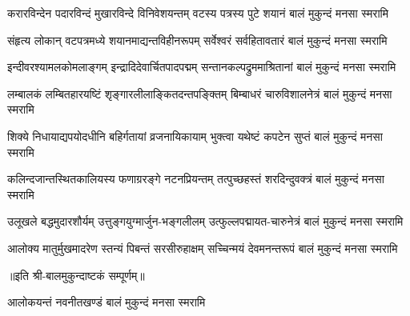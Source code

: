 

\twolineshloka
{करारविन्देन पदारविन्दं मुखारविन्दे विनिवेशयन्तम्}
{वटस्य पत्रस्य पुटे शयानं बालं मुकुन्दं मनसा स्मरामि}%

\twolineshloka
{संहृत्य लोकान् वटपत्रमध्ये शयानमाद्यन्तविहीनरूपम्}
{सर्वेश्वरं सर्वहितावतारं बालं मुकुन्दं मनसा स्मरामि}%

\twolineshloka
{इन्दीवरश्यामलकोमलाङ्गम् इन्द्रादिदेवार्चितपादपद्मम्}
{सन्तानकल्पद्रुममाश्रितानां बालं मुकुन्दं मनसा स्मरामि}%

\twolineshloka
{लम्बालकं लम्बितहारयष्टिं शृङ्गारलीलाङ्कितदन्तपङ्क्तिम्}
{बिम्बाधरं चारुविशालनेत्रं बालं मुकुन्दं मनसा स्मरामि}%

\twolineshloka
{शिक्ये निधायाद्यपयोदधीनि बहिर्गतायां व्रजनायिकायाम्}
{भुक्त्वा यथेष्टं कपटेन सुप्तं बालं मुकुन्दं मनसा स्मरामि}%

\twolineshloka
{कलिन्दजान्तस्थितकालियस्य फणाग्ररङ्गे नटनप्रियन्तम्}
{तत्पुच्छहस्तं शरदिन्दुवक्त्रं बालं मुकुन्दं मनसा स्मरामि}%

\twolineshloka
{उलूखले बद्धमुदारशौर्यम् उत्तुङ्गयुग्मार्जुन-भङ्गलीलम्}
{उत्फुल्लपद्मायत-चारुनेत्रं बालं मुकुन्दं मनसा स्मरामि}%

\twolineshloka
{आलोक्य मातुर्मुखमादरेण स्तन्यं पिबन्तं सरसीरुहाक्षम्}
{सच्चिन्मयं देवमनन्तरूपं बालं मुकुन्दं मनसा स्मरामि}%

॥इति श्री-बालमुकुन्दाष्टकं सम्पूर्णम्‌॥

{आलोकयन्तं नवनीतखण्डं बालं मुकुन्दं मनसा स्मरामि}%